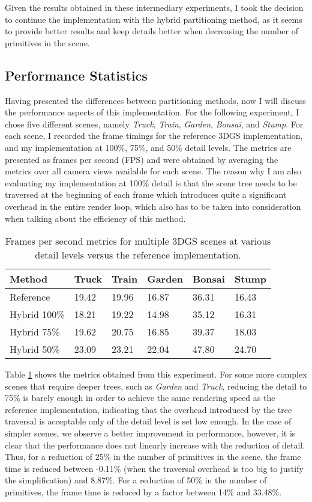 Given the results obtained in these intermediary experiments, I took the decision to continue the implementation with the hybrid partitioning method, as it seems to provide better results and keep details better when decreasing the number of primitives in the scene.

\subsection{Performance Statistics}
Having presented the differences between partitioning methods, now I will discuss the performance aspects of this implementation. For the following experiment, I chose five different scenes, namely \textit{Truck}, \textit{Train}, \textit{Garden}, \textit{Bonsai}, and \textit{Stump}. For each scene, I recorded the frame timings for the reference 3DGS implementation, and my implementation at 100\%, 75\%, and 50\% detail levels. The metrics are presented as frames per second (FPS) and were obtained by averaging the metrics over all camera views available for each scene. The reason why I am also evaluating my implementation at 100\% detail is that the scene tree needs to be traversed at the beginning of each frame which introduces quite a significant overhead in the entire render loop, which also has to be taken into consideration when talking about the efficiency of this method. 

\begin{table}[H]
\centering
\begin{tabular}{l|lllll}
Method       & Truck & Train & Garden & Bonsai & Stump \\ \hline
Reference    & 19.42 & 19.96 & 16.87  & 36.31  & 16.43 \\ \hline
Hybrid 100\% & 18.21 & 19.22 & 14.98  & 35.12  & 16.31 \\ \hline
Hybrid 75\%  & 19.62 & 20.75 & 16.85  & 39.37  & 18.03 \\ \hline
Hybrid 50\%  & 23.09 & 23.21 & 22.04  & 47.80  & 24.70
\end{tabular}
\caption{Frames per second metrics for multiple 3DGS scenes at various detail levels versus the reference implementation.}
\label{tab:fpsmetrics}
\end{table}

Table \ref{tab:fpsmetrics} shows the metrics obtained from this experiment. For some more complex scenes that require deeper trees, such as \textit{Garden} and \textit{Truck}, reducing the detail to 75\% is barely enough in order to achieve the same rendering speed as the reference implementation, indicating that the overhead introduced by the tree traversal is acceptable only of the detail level is set low enough. In the case of simpler scenes, we observe a better improvement in performance, however, it is clear that the performance does not linearly increase with the reduction of detail. Thus, for a reduction of 25\% in the number of primitives in the scene, the frame time is reduced between -0.11\% (when the traversal overhead is too big to justify the simplification) and 8.87\%. For a reduction of 50\% in the number of primitives, the frame time is reduced by a factor between 14\% and 33.48\%.

